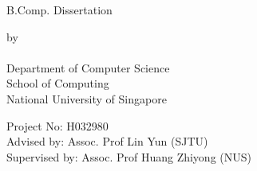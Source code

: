 \makeatletter
\begin{titlepage}
\begin{center}

B.Comp. Dissertation 
\\[7cm]
\uppercase{\textbf{\@title}}

\vfill

by
\\[1cm]

\@author
\\[3cm]

Department of Computer Science \\
School of Computing \\
National University of Singapore \\
\@date

\end{center}

Project No: H032980\\
Advised by: Assoc. Prof Lin Yun (SJTU)\\
Supervised by: Assoc. Prof Huang Zhiyong (NUS)
\end{titlepage}
\makeatother